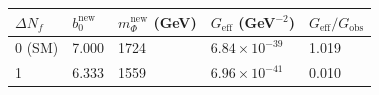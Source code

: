 \documentclass[
  11pt,
]{article}
\begin{document}
\begin{longtable}[]{@{}lllll@{}}
\toprule
\begin{minipage}[b]{0.17\columnwidth}\raggedright
\(\Delta N_f\)\strut
\end{minipage} & \begin{minipage}[b]{0.17\columnwidth}\raggedright
\(b_0^{\text{new}}\)\strut
\end{minipage} & \begin{minipage}[b]{0.17\columnwidth}\raggedright
\(m_\Phi^{\text{new}}\) (GeV)\strut
\end{minipage} & \begin{minipage}[b]{0.17\columnwidth}\raggedright
\(G_{\text{eff}}\) (GeV\(^{-2}\))\strut
\end{minipage} & \begin{minipage}[b]{0.17\columnwidth}\raggedright
\(G_{\text{eff}} / G_{\text{obs}}\)\strut
\end{minipage}\tabularnewline
\midrule
\endhead
\begin{minipage}[t]{0.17\columnwidth}\raggedright
0 (SM)\strut
\end{minipage} & \begin{minipage}[t]{0.17\columnwidth}\raggedright
7.000\strut
\end{minipage} & \begin{minipage}[t]{0.17\columnwidth}\raggedright
1724\strut
\end{minipage} & \begin{minipage}[t]{0.17\columnwidth}\raggedright
\(6.84 \times 10^{-39}\)\strut
\end{minipage} & \begin{minipage}[t]{0.17\columnwidth}\raggedright
1.019\strut
\end{minipage}\tabularnewline
\begin{minipage}[t]{0.17\columnwidth}\raggedright
1\strut
\end{minipage} & \begin{minipage}[t]{0.17\columnwidth}\raggedright
6.333\strut
\end{minipage} & \begin{minipage}[t]{0.17\columnwidth}\raggedright
1559\strut
\end{minipage} & \begin{minipage}[t]{0.17\columnwidth}\raggedright
\(6.96 \times 10^{-41}\)\strut
\end{minipage} & \begin{minipage}[t]{0.17\columnwidth}\raggedright
0.010\strut
\end{minipage}\tabularnewline

\end{longtable}
\end{document}
